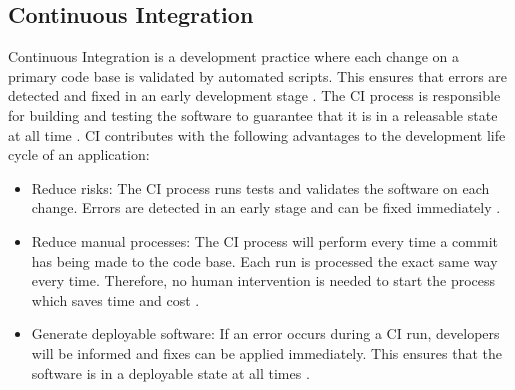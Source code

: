 \subsection{Continuous Integration}
Continuous Integration is a development practice where each change on a primary code base is validated by automated scripts. This ensures that errors are detected and fixed in an early development stage \cite{Duvall2007CI}.
The CI process is responsible for building and testing the software to guarantee that it is in a releasable state at all time \cite{Rossel2017CICD}.
CI contributes with the following advantages to the development life cycle of an application:
\begin{itemize}
\item Reduce risks:
The CI process runs tests and validates the software on each change. Errors are detected in an early stage and can be fixed immediately \cite{Duvall2007CI}.

\item Reduce manual processes:
The CI process will perform every time a commit has being made to the code base.
Each run is processed the exact same way every time.
Therefore, no human intervention is needed to start the process which saves time and cost \cite{Duvall2007CI}.

\item Generate deployable software:
If an error occurs during a CI run, developers will be informed and fixes can be applied immediately.
This ensures that the software is in a deployable state at all times \cite{Duvall2007CI}.
\end{itemize}


